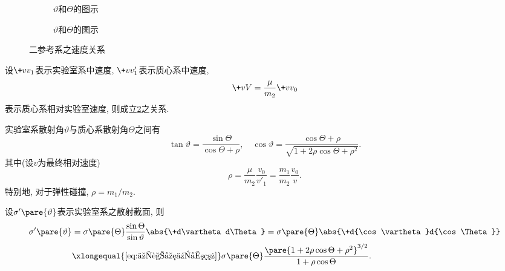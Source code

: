 \documentclass[../TheoreticalMechanics.tex]{subfiles}
\begin{document}
\begin{figure}[ht]
    \centering
    \begin{subfigure}[b]{.4\textwidth}
        \centering
        \caption{$\vartheta$和$\Theta$的图示}
    \end{subfigure}
    \begin{subfigure}[b]{.4\textwidth}
        \centering
        \caption{$\vartheta$和$\Theta$的图示}
    \end{subfigure}
    \caption{}
    \label{fig:二参考系的散射}
\end{figure}
\begin{figure}[ht]
    \centering
    \caption{二参考系之速度关系}
    \label{fig:二参考系之速度关系}
\end{figure}
\begin{lemma}[二参考系之速度关系]
    设$\+vv_1$表示实验室系中速度, $\+vv'_1$表示质心系中速度,
    \[ \+vV = \frac{\mu}{m_2} \+vv_0 \]
    表示质心系相对实验室速度, 则成立\cref{fig:二参考系之速度关系}之关系.
\end{lemma}
\begin{lemma}[二角度之关系]
    实验室系散射角$\vartheta$与质心系散射角$\Theta$之间有
    \begin{equation}
        \label{eq:二角度之关系}
        \tan\vartheta = \frac{\sin\Theta}{\cos\Theta + \rho},\quad \cos\vartheta = \frac{\cos\Theta + \rho}{\sqrt{1+2\rho\cos\Theta+\rho^2}}.
    \end{equation}
    其中(设$v$为最终相对速度)
    \[ \rho = \frac{\mu}{m_2}\frac{v_0}{v'_1} = \frac{m_1}{m_2}\frac{v_0}{v}. \]
    特别地, 对于弹性碰撞, $\rho = m_1/m_2$.
\end{lemma}
\begin{finale}
    \begin{theorem}[二散射截面之关系]
        设$\sigma'\pare{\vartheta}$表示实验室系之散射截面, 则
        \begin{align*}
            \sigma'\pare{\vartheta} &= \sigma\pare{\Theta}\frac{\sin\Theta}{\sin\vartheta}\abs{\+d\vartheta d\Theta} = \sigma\pare{\Theta}\abs{\+d{\cos\vartheta}d{\cos\Theta}} \\ &\xlongequal{\eqref{eq:二角度之关系}} \sigma\pare{\Theta}\frac{\pare{1+2\rho\cos\Theta+\rho^2}^{3/2}}{1+\rho\cos\Theta}.
        \end{align*}
    \end{theorem}
\end{finale}
\end{document}
